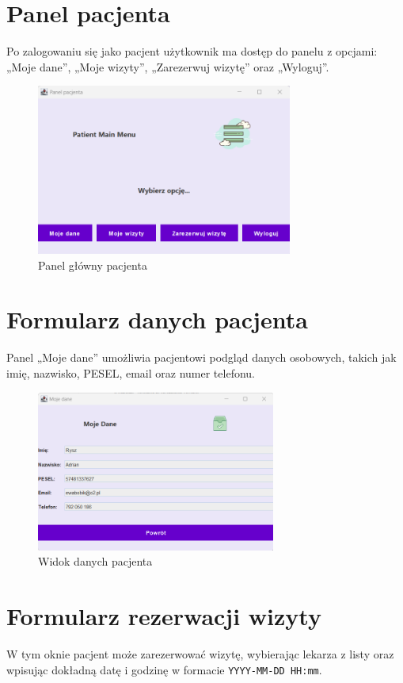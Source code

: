 \clearpage
\section{Panel pacjenta}
Po zalogowaniu się jako pacjent użytkownik ma dostęp do panelu z opcjami: „Moje dane”, „Moje wizyty”, „Zarezerwuj wizytę” oraz „Wyloguj”.

\begin{figure}[H]
\centering
\includegraphics[width=0.75\textwidth]{figures/patient_panel.png}
\caption{Panel główny pacjenta}
\end{figure}


\section{Formularz danych pacjenta}
Panel „Moje dane” umożliwia pacjentowi podgląd danych osobowych, takich jak imię, nazwisko, PESEL, email oraz numer telefonu.

\begin{figure}[H]
\centering
\includegraphics[width=0.7\textwidth]{figures/MyDataPatients.png}
\caption{Widok danych pacjenta}
\end{figure}
\clearpage
\section{Formularz rezerwacji wizyty}
W tym oknie pacjent może zarezerwować wizytę, wybierając lekarza z listy oraz wpisując dokładną datę i godzinę w formacie \texttt{YYYY-MM-DD HH:mm}.

